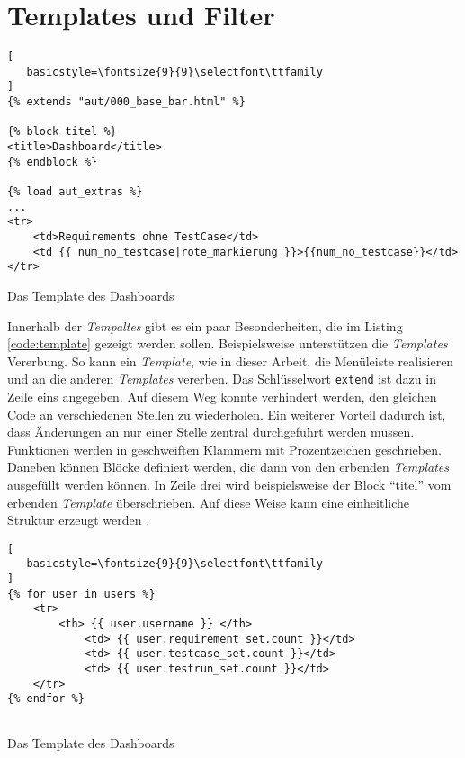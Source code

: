 \documentclass[11pt,a4paper]{report}
\begin{document}
\section{Templates und Filter}
\label{s:itemp}

\begin{listing}[htbp]
\begin{lstlisting}[
   basicstyle=\fontsize{9}{9}\selectfont\ttfamily
]
{% extends "aut/000_base_bar.html" %}

{% block titel %}
<title>Dashboard</title>
{% endblock %}

{% load aut_extras %}
...
<tr>
	<td>Requirements ohne TestCase</td>
    <td {{ num_no_testcase|rote_markierung }}>{{num_no_testcase}}</td>
</tr>
\end{lstlisting}
\caption{Das Template des Dashboards}
\label{code:template}
\end{listing}


Innerhalb der \textit{Tempaltes} gibt es ein paar Besonderheiten, die im Listing \ref{code:template} gezeigt werden sollen. Beispielsweise unterstützen die \textit{Templates} Vererbung. So kann ein \textit{Template}, wie in dieser Arbeit, die Menüleiste realisieren und an die anderen \textit{Templates} vererben. Das Schlüsselwort \verb|extend| ist dazu in Zeile eins angegeben. Auf diesem Weg konnte verhindert werden, den gleichen Code an verschiedenen Stellen zu wiederholen. Ein weiterer Vorteil dadurch ist, dass Änderungen an nur einer Stelle zentral durchgeführt werden müssen. Funktionen werden in geschweiften Klammern mit Prozentzeichen geschrieben. Daneben können Blöcke definiert werden, die dann von den erbenden \textit{Templates} ausgefüllt werden können. In Zeile drei wird beispielsweise der Block "`titel"' vom erbenden \textit{Template} überschrieben. Auf diese Weise kann eine einheitliche Struktur erzeugt werden \cite{djangotuto1}.


\begin{listing}[htbp]
\begin{lstlisting}[
   basicstyle=\fontsize{9}{9}\selectfont\ttfamily
]
{% for user in users %}
	<tr>
    	<th> {{ user.username }} </th>
            <td> {{ user.requirement_set.count }}</td>
            <td> {{ user.testcase_set.count }}</td>
            <td> {{ user.testrun_set.count }}</td>
	</tr>
{% endfor %}
       
\end{lstlisting}
\caption{Das Template des Dashboards}
\label{code:punkt}
\end{listing}
\end{document}
